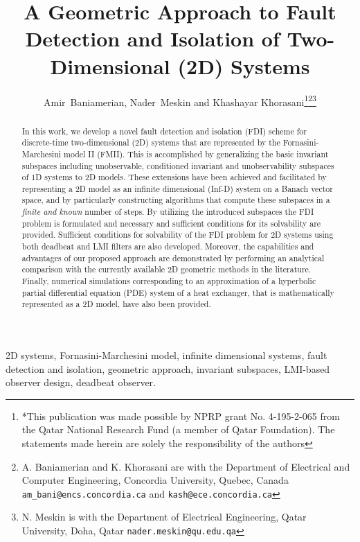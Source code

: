 \documentclass[journal,12pt,draftcls,onecolumn]{IEEEtran}
\begin{document}
\title{A Geometric Approach to Fault Detection and Isolation of Two-Dimensional (2D) Systems}


\author{Amir~Baniamerian, Nader~Meskin and Khashayar Khorasani\thanks{*This publication was made possible by NPRP grant No. 4-195-2-065 from the
Qatar National Research Fund (a member of Qatar Foundation). The
statements made herein are solely the responsibility of the authors}\thanks{A. Baniamerian and K. Khorasani are with the Department of Electrical and Computer Engineering,
        Concordia University, Quebec, Canada
        {\tt\small am\_bani@encs.concordia.ca} and {\tt\small kash@ece.concordia.ca}}\thanks{N. Meskin is with the Department of Electrical Engineering, Qatar University,
        Doha, Qatar
        {\tt\small nader.meskin@qu.edu.qa}}}


\maketitle

\begin{abstract}
In this work, we develop a novel fault detection and isolation (FDI) scheme for discrete-time two-dimensional (2D) systems that are represented by the Fornasini-Marchesini model II (FMII). This is accomplished by generalizing the  basic invariant subspaces including unobservable, conditioned invariant and unobservability subspaces of 1D systems to 2D models. These extensions have been achieved and facilitated by representing a 2D model as an infinite dimensional (Inf-D) system  on a Banach vector space, and by particularly constructing algorithms that compute these subspaces in a \emph{finite and known} number of steps. By utilizing the introduced subspaces the FDI problem is formulated and necessary and sufficient conditions for its solvability are provided. Sufficient conditions for solvability of the FDI problem for 2D systems using both deadbeat and LMI filters are also developed. Moreover, the capabilities and advantages of our proposed approach are demonstrated  by performing  an analytical comparison with the currently available 2D geometric methods in the literature. Finally, numerical simulations corresponding to an approximation of a hyperbolic partial differential equation (PDE)  system of a heat exchanger, that is mathematically represented as a 2D model, have also been provided. \end{abstract}

\begin{IEEEkeywords}
2D systems, Fornasini-Marchesini model, infinite dimensional systems, fault detection and isolation, geometric approach, invariant subspaces, LMI-based observer design, deadbeat observer.
\end{IEEEkeywords}
\end{document}
